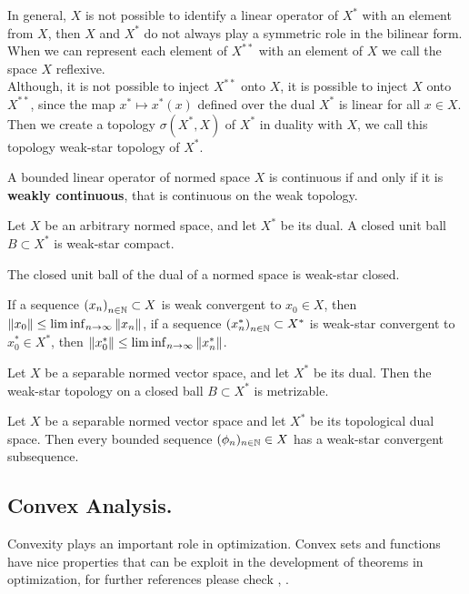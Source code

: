 In general, $X$ is not possible to identify a linear operator of $X^*$ with an element from $X$, then $X$ and $X^*$ do not always play a symmetric role in the bilinear form. When we can represent each element of $X^{**}$ with an element of $X$ we call the space $X$ reflexive.\\

Although, it is not possible to inject $X^{**}$ onto $X$, it is possible to inject $X$ onto $X^{**}$, since the map $x^*\mapsto x^*(x)$ defined over the dual $X^*$ is linear for all $x\in X$. Then we create a topology  $\sigma(X^*, X)$ of $X^*$ in  duality with $X$, we call this topology weak-star topology of $X^*$.

A bounded linear operator of normed space $X$ is continuous if and only if it is \textbf{weakly continuous}, that is continuous on the weak topology.\\
\begin{theorem}
Let $X$ be an arbitrary normed space, and let $X^*$ be its dual. A closed unit ball $B\subset X^*$ is weak-star compact.
\end{theorem}

\begin{corollary}
The closed unit ball of the dual of a normed space is weak-star closed.
\end{corollary}
If a sequence $\left( x_n \right)_{n\in\mathbb{N}}\subset X$ is weak convergent to $x_0\in X$, then
$\left\|x_0\right\|\leq \liminf_{n\to\infty}\left\|x_n\right\|$, if a sequence $\left( x^*_n \right)_{n\in\mathbb{N}}\subset X^*$ is weak-star convergent to $x_0^*\in X^*$, then
$\left\|x^*_0\right\|\leq \liminf_{n\to\infty}\left\|x^*_n\right\|$.
\begin{theorem}
Let $X$ be a separable normed vector space, and let $X^*$ be its dual. Then the weak-star topology on a closed ball $B\subset X^*$ is metrizable. 
\end{theorem}
\begin{corollary} Let $X$ be a separable normed vector space and let $X^*$ be its topological dual space. Then every bounded sequence $(\phi_n)_{n\in \mathbb{N}}\in X$ has a weak-star convergent subsequence.
\end{corollary}

\subsection{Convex Analysis.}
Convexity plays an important role in optimization. Convex sets and functions have nice properties that can be exploit in the development of theorems in optimization, for further references please check \cite{Barbu2012Optimization}, \cite{Ekeland1999Convex}. 
 
